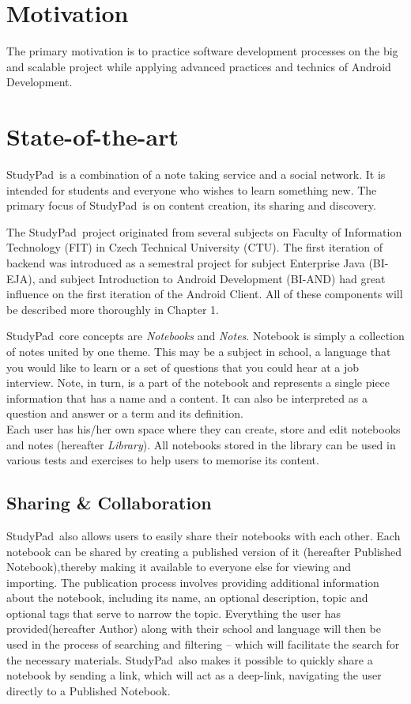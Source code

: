 \documentclass[thesis=B,english]{FITthesis}[2012/10/20]
\newcommand{\appname}{StudyPad}
\begin{document}
\section{Motivation}
The primary motivation is to practice software
development processes on the big and scalable project while applying advanced practices and technics of Android Development.

\section{State-of-the-art}
\appname\ is a combination of a note taking service and a social network. It is intended for students and everyone who wishes to learn something new. The primary focus of \appname\ is on content creation, its sharing and discovery. 

The \appname\ project originated from several subjects on Faculty of Information Technology (FIT) in Czech Technical University (CTU). The first iteration of backend was introduced as a semestral project for subject Enterprise Java (BI-EJA), and subject Introduction to Android Development (BI-AND) had great influence on the first iteration of the Android Client. All of these components will be described more thoroughly in Chapter 1.
 

\appname\ core concepts are \textit{Notebooks} and \textit{Notes}. Notebook is simply a collection of notes united by one theme. This may be a subject in school, a language that you would like to learn or a set of questions that you could hear at a job interview. Note, in turn, is a part of the notebook and represents a single piece information that has a name and a content. It can also be interpreted as a question and answer or a term and its definition.
\\

Each user has his/her own space where they can create, store and edit notebooks and notes (hereafter \textit{Library}). All notebooks stored in the library can be used in various tests and exercises to help users to memorise its content.
\subsection{Sharing \& Collaboration}
\appname\ also allows users to easily share their notebooks with each other. Each notebook can be shared by creating a published version of it (hereafter Published Notebook),thereby making it available to everyone else for viewing and importing.
The publication process involves providing additional information about the notebook, including its name, an optional description, topic and optional tags that serve to narrow the topic. Everything the user has provided(hereafter Author) along with their school and language will then be used in the process of searching and filtering -- which will facilitate the search for the necessary materials. \appname\ also makes it possible to quickly share a notebook by sending a link, which will act as a deep-link, navigating the user directly to a Published Notebook.
\end{document}
